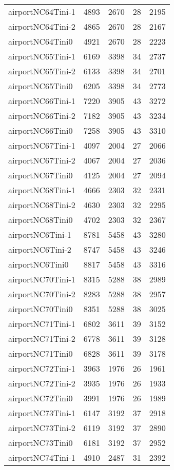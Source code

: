 \begin{longtable}{lrrrr}
airportNC64Tini-1 & 4893 & 2670 & 28 & 2195 \\
airportNC64Tini-2 & 4865 & 2670 & 28 & 2167 \\
airportNC64Tini0 & 4921 & 2670 & 28 & 2223 \\
airportNC65Tini-1 & 6169 & 3398 & 34 & 2737 \\
airportNC65Tini-2 & 6133 & 3398 & 34 & 2701 \\
airportNC65Tini0 & 6205 & 3398 & 34 & 2773 \\
airportNC66Tini-1 & 7220 & 3905 & 43 & 3272 \\
airportNC66Tini-2 & 7182 & 3905 & 43 & 3234 \\
airportNC66Tini0 & 7258 & 3905 & 43 & 3310 \\
airportNC67Tini-1 & 4097 & 2004 & 27 & 2066 \\
airportNC67Tini-2 & 4067 & 2004 & 27 & 2036 \\
airportNC67Tini0 & 4125 & 2004 & 27 & 2094 \\
airportNC68Tini-1 & 4666 & 2303 & 32 & 2331 \\
airportNC68Tini-2 & 4630 & 2303 & 32 & 2295 \\
airportNC68Tini0 & 4702 & 2303 & 32 & 2367 \\
airportNC6Tini-1 & 8781 & 5458 & 43 & 3280 \\
airportNC6Tini-2 & 8747 & 5458 & 43 & 3246 \\
airportNC6Tini0 & 8817 & 5458 & 43 & 3316 \\
airportNC70Tini-1 & 8315 & 5288 & 38 & 2989 \\
airportNC70Tini-2 & 8283 & 5288 & 38 & 2957 \\
airportNC70Tini0 & 8351 & 5288 & 38 & 3025 \\
airportNC71Tini-1 & 6802 & 3611 & 39 & 3152 \\
airportNC71Tini-2 & 6778 & 3611 & 39 & 3128 \\
airportNC71Tini0 & 6828 & 3611 & 39 & 3178 \\
airportNC72Tini-1 & 3963 & 1976 & 26 & 1961 \\
airportNC72Tini-2 & 3935 & 1976 & 26 & 1933 \\
airportNC72Tini0 & 3991 & 1976 & 26 & 1989 \\
airportNC73Tini-1 & 6147 & 3192 & 37 & 2918 \\
airportNC73Tini-2 & 6119 & 3192 & 37 & 2890 \\
airportNC73Tini0 & 6181 & 3192 & 37 & 2952 \\
airportNC74Tini-1 & 4910 & 2487 & 31 & 2392 \\

\end{longtable}
